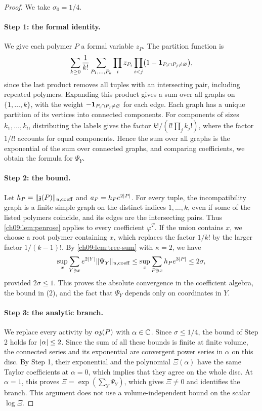 \begin{proof}
We take $\sigma_0=1/4$.

\paragraph{Step 1: the formal identity.}
We give each polymer $P$ a formal variable $z_P$. The partition function is
\[
 \sum_{k\ge0}\frac1{k!}\sum_{P_1,\ldots,P_k}\prod_iz_{P_i}\prod_{i<j}\bigl(1-\mathbf 1_{P_i\cap P_j\ne\varnothing}\bigr),
\]
since the last product removes all tuples with an intersecting pair, including repeated polymers. Expanding this product gives a sum over all graphs on $\{1,\ldots,k\}$, with the weight $-\mathbf 1_{P_i\cap P_j\ne\varnothing}$ for each edge. Each graph has a unique partition of its vertices into connected components. For components of sizes $k_1,\ldots,k_l$, distributing the labels gives the factor $k!/(l!\prod_jk_j!)$, where the factor $1/l!$ accounts for equal components. Hence the sum over all graphs is the exponential of the sum over connected graphs, and comparing coefficients, we obtain the formula for $\Psi_Y$.

\paragraph{Step 2: the bound.}
Let $h_P=\lVert \mathfrak z(P)\rVert_{u,\mathrm{coeff}}$ and $a_P=h_Pe^{2\lvert P\rvert}$. For every tuple, the incompatibility graph is a finite simple graph on the distinct indices $1,\ldots,k$, even if some of the listed polymers coincide, and its edges are the intersecting pairs. Thus \cref{ch09:lem:penrose} applies to every coefficient $\varphi^T$. If the union contains $x$, we choose a root polymer containing $x$, which replaces the factor $1/k!$ by the larger factor $1/(k-1)!$. By \cref{ch09:lem:tree-sum} with $\kappa=2$, we have
\[
 \sup_x\sum_{Y\ni x}e^{2\lvert Y\rvert}\lVert \Psi_Y\rVert_{u,\mathrm{coeff}}\le\sup_x\sum_{P\ni x}h_Pe^{3\lvert P\rvert}\le2\sigma,
\]
provided $2\sigma\le1$. This proves the absolute convergence in the coefficient algebra, the bound in (2), and the fact that $\Psi_Y$ depends only on coordinates in $Y$.

\paragraph{Step 3: the analytic branch.}
We replace every activity by $\alpha\mathfrak z(P)$ with $\alpha\in\mathbb C$. Since $\sigma\le1/4$, the bound of Step 2 holds for $\lvert \alpha\rvert\le2$. Since the sum of all these bounds is finite at finite volume, the connected series and its exponential are convergent power series in $\alpha$ on this disc. By Step 1, their exponential and the polynomial $\Xi(\alpha)$ have the same Taylor coefficients at $\alpha=0$, which implies that they agree on the whole disc. At $\alpha=1$, this proves $\Xi=\exp(\sum_Y\Psi_Y)$, which gives $\Xi\ne0$ and identifies the branch. This argument does not use a volume-independent bound on the scalar $\log\Xi$.


\end{proof}
